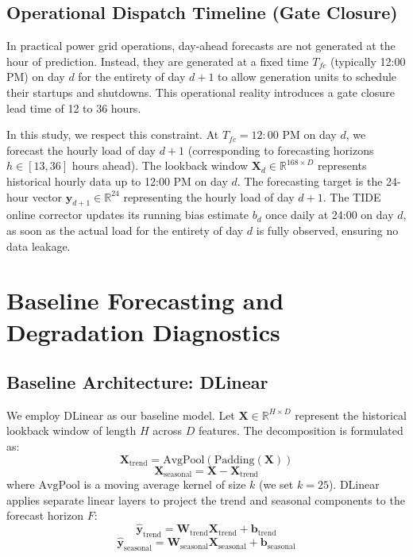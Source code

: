 \documentclass[journal]{IEEEtran}
\begin{document}
\subsection{Operational Dispatch Timeline (Gate Closure)}
In practical power grid operations, day-ahead forecasts are not generated at the hour of prediction. Instead, they are generated at a fixed time $T_{fc}$ (typically 12:00 PM) on day $d$ for the entirety of day $d+1$ to allow generation units to schedule their startups and shutdowns. This operational reality introduces a gate closure lead time of 12 to 36 hours.

In this study, we respect this constraint. At $T_{fc} = 12:00$ PM on day $d$, we forecast the hourly load of day $d+1$ (corresponding to forecasting horizons $h \in [13, 36]$ hours ahead). The lookback window $\mathbf{X}_d \in \mathbb{R}^{168 \times D}$ represents historical hourly data up to 12:00 PM on day $d$. The forecasting target is the 24-hour vector $\mathbf{y}_{d+1} \in \mathbb{R}^{24}$ representing the hourly load of day $d+1$. The TIDE online corrector updates its running bias estimate $b_d$ once daily at 24:00 on day $d$, as soon as the actual load for the entirety of day $d$ is fully observed, ensuring no data leakage.

\section{Baseline Forecasting and Degradation Diagnostics}

\subsection{Baseline Architecture: DLinear}
We employ DLinear \cite{zeng2023} as our baseline model. Let $\mathbf{X} \in \mathbb{R}^{H \times D}$ represent the historical lookback window of length $H$ across $D$ features. The decomposition is formulated as:
\begin{equation}
\mathbf{X}_{\text{trend}} = \text{AvgPool}(\text{Padding}(\mathbf{X}))
\end{equation}
\begin{equation}
\mathbf{X}_{\text{seasonal}} = \mathbf{X} - \mathbf{X}_{\text{trend}}
\end{equation}
where $\text{AvgPool}$ is a moving average kernel of size $k$ (we set $k=25$). DLinear applies separate linear layers to project the trend and seasonal components to the forecast horizon $F$:
\begin{equation}
\hat{\mathbf{y}}_{\text{trend}} = \mathbf{W}_{\text{trend}} \mathbf{X}_{\text{trend}} + \mathbf{b}_{\text{trend}}
\end{equation}
\begin{equation}
\hat{\mathbf{y}}_{\text{seasonal}} = \mathbf{W}_{\text{seasonal}} \mathbf{X}_{\text{seasonal}} + \mathbf{b}_{\text{seasonal}}
\end{equation}
\end{document}
